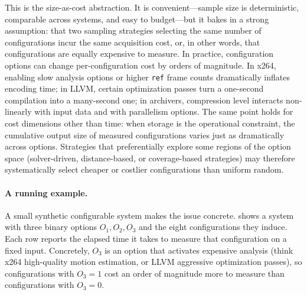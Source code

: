 This is the size-as-cost abstraction. It is convenient---sample size is
deterministic, comparable across systems, and easy to budget---but it bakes
in a strong assumption: that two sampling strategies selecting the same
number of configurations incur the same acquisition cost, or, in other
words, that configurations are equally expensive to measure. In practice,
configuration options can change per-configuration cost by orders of
magnitude. In x264, enabling slow analysis options or higher \texttt{ref}
frame counts dramatically inflates encoding time; in LLVM, certain
optimization passes turn a one-second compilation into a many-second one;
in archivers, compression level interacts non-linearly with input data and
with parallelism options. The same point holds for cost dimensions other
than time: when storage is the operational constraint, the cumulative
output size of measured configurations varies just as dramatically across
options. Strategies that preferentially explore some regions of the option
space (\eg solver-driven, distance-based, or coverage-based strategies)
may therefore systematically select cheaper or costlier configurations
than uniform random.

\paragraph*{A running example.}
A small synthetic configurable system makes the issue concrete.
 shows a system with three binary options
$O_1, O_2, O_3$ and the eight configurations they induce. Each row
reports the elapsed time it takes to measure that configuration on a
fixed input. Concretely, $O_3$ is an option that activates expensive
analysis (think x264 high-quality motion estimation, or LLVM aggressive
optimization passes), so configurations with $O_3=1$ cost an order of
magnitude more to measure than configurations with $O_3=0$.

